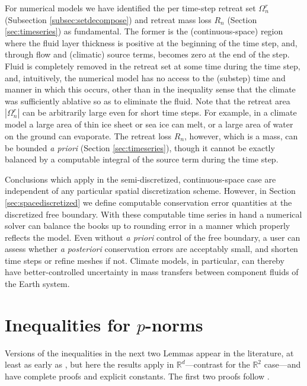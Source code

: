 \documentclass[final,onefignum]{siamart190516}
\newcommand\RR{\mathbb{R}}
\begin{document}
For numerical models we have identified the per time-step retreat set $\Omega_n^r$ (Subsection \ref{subsec:setdecompose}) and retreat mass loss $R_n$ (Section \ref{sec:timeseries}) as fundamental.  The former is the (continuous-space) region where the fluid layer thickness is positive at the beginning of the time step, and, through flow and (climatic) source terms, becomes zero at the end of the step.  Fluid is completely removed in the retreat set at some time during the time step, and, intuitively, the numerical model has no access to the (substep) time and manner in which this occurs, other than in the inequality sense that the climate was sufficiently ablative so as to eliminate the fluid.  Note that the retreat area $|\Omega_n^r|$ can be arbitrarily large even for short time steps.  For example, in a climate model a large area of thin ice sheet or sea ice can melt, or a large area of water on the ground can evaporate.  The retreat loss $R_n$, however, which is a mass, can be bounded \emph{a priori} (Section \ref{sec:timeseries}), though it cannot be exactly balanced by a computable integral of the source term during the time step.

Conclusions which apply in the semi-discretized, continuous-space case are independent of any particular spatial discretization scheme.  However, in Section \ref{sec:spacediscretized} we define computable conservation error quantities at the discretized free boundary.  With these computable time series in hand a numerical solver can balance the books up to rounding error in a manner which properly reflects the model.  Even without \emph{a priori} control of the free boundary, a user can assess whether \emph{a posteriori} conservation errors are acceptably small, and shorten time steps or refine meshes if not.  Climate models, in particular, can thereby have better-controlled uncertainty in mass transfers between component fluids of the Earth system.






\appendix

\section{Inequalities for $p$-norms}   \label{app:pinequalities}  Versions of the inequalities in the next two Lemmas appear in the literature, at least as early as \cite{GlowinskiMarroco1975}, but here the results apply in $\RR^d$---contrast \cite{BarrettLiu1993} for the $\RR^2$ case---and have complete proofs and explicit constants.  The first two proofs follow \cite[Appendix A]{Peral1997}.
\end{document}
